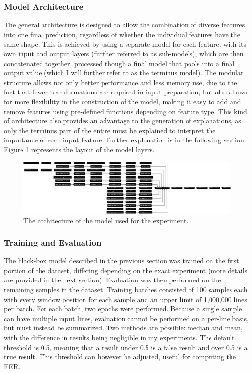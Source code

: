 \documentclass{article}
\begin{document}
			\subsubsection{Model Architecture}
			The general architecture is designed to allow the combination of diverse features into
			one final prediction, regardless of whether the individual features have the same
			shape. This is achieved by using a separate model for each feature, with its own input
			and output layers (further referred to as sub-models), which are then concatenated
			together, processed though a final model that pools into a final output value (which I
			will further refer to as the terminus model). The modular structure allows not only
			better performance and less memory use, due to the fact that fewer transformations are
			required in input preparation, but also allows for more flexibility in the
			construction of the model, making it easy to add and remove features using pre-defined
			functions depending on feature type. This kind of architecture also provides an
			advantage to the generation of explanations, as only the terminus part of the entire
			must be explained to interpret the importance of each input feature. Further
			explanation is in the following section. Figure \ref{fig:model_plot} represents the
			layout of the model layers.
			\begin{figure}[htbp]
				\begin{center}
					\includegraphics[width=1\textwidth]{images/model_plot.png}
					\caption{The architecture of the model used for the experiment.}
					\label{fig:model_plot}
				\end{center}
			\end{figure}
			\subsubsection{Training and Evaluation}
			The black-box model described in the previous section was trained on the first portion
			of the dataset, differing depending on the exact experiment (more details are provided
			in the next section). Evaluation was then performed on the remaining samples in the
			dataset. Training batches consisted of 100 samples each with every window position for
			each sample and an upper limit of 1,000,000 lines per batch. For each batch, two
			epochs were performed. Because a single sample can have multiple input lines,
			evaluation cannot be performed on a per-line basis, but must instead be summarized.
			Two methods are possible: median and mean, with the difference in results being
			negligible in my experiments. The default threshold is 0.5, meaning that a result
			under 0.5 is a false result and over 0.5 is a true result. This threshold can however
			be adjusted, useful for computing the EER.
\end{document}
